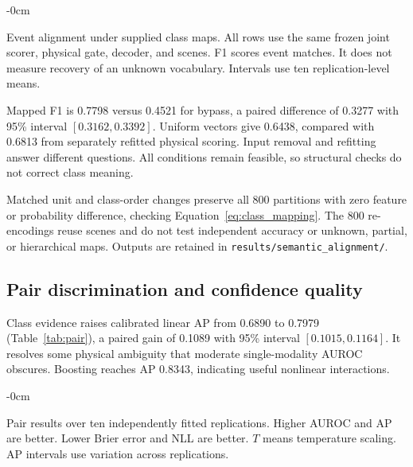 \begin{table}[!t]\begin{adjustwidth}{-\extralength}{0cm}
\caption{Event alignment under supplied class maps. All rows use the same frozen joint scorer, physical gate, decoder, and scenes. F1 scores event matches. It does not measure recovery of an unknown vocabulary. Intervals use ten replication-level means.}\label{tab:semantic_alignment}
\small\renewcommand{\arraystretch}{1.12}
\end{adjustwidth}\end{table}

Mapped F1 is 0.7798 versus 0.4521 for bypass, a paired difference of 0.3277 with 95\% interval $[0.3162,0.3392]$. Uniform vectors give 0.6438, compared with 0.6813 from separately refitted physical scoring. Input removal and refitting answer different questions. All conditions remain feasible, so structural checks do not correct class meaning.

Matched unit and class-order changes preserve all 800 partitions with zero feature or probability difference, checking Equation~\eqref{eq:class_mapping}. The 800 re-encodings reuse scenes and do not test independent accuracy or unknown, partial, or hierarchical maps. Outputs are retained in \texttt{results/semantic\_alignment/}.

\subsection{Pair discrimination and confidence quality}
Class evidence raises calibrated linear AP from 0.6890 to 0.7979 (Table~\ref{tab:pair}), a paired gain of 0.1089 with 95\% interval $[0.1015,0.1164]$. It resolves some physical ambiguity that moderate single-modality AUROC obscures. Boosting reaches AP 0.8343, indicating useful nonlinear interactions.

\begin{table}[!t]\begin{adjustwidth}{-\extralength}{0cm}
\caption{Pair results over ten independently fitted replications. Higher AUROC and AP are better. Lower Brier error and NLL are better. $T$ means temperature scaling. AP intervals use variation across replications.}\label{tab:pair}
\small\renewcommand{\arraystretch}{1.12}
\end{adjustwidth}\end{table}


